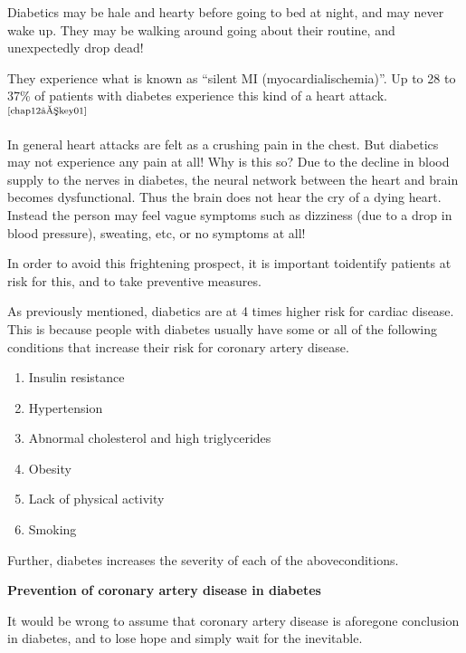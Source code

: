 
Diabetics may be hale and hearty before going to bed at night, and may never wake up. They may be walking around going about their routine, and unexpectedly drop dead!

They experience what is known as “silent MI (myocardial\break ischemia)”. Up to 28 to 37\% of patients with diabetes experience this kind of a heart attack.$^{\text{\cite{chap12–key01}}}$

In general heart attacks are felt as a crushing pain in the chest. But diabetics may not experience any pain at all! Why is this so? Due to the decline in blood supply to the nerves in diabetes, the neural network between the heart and brain becomes dysfunctional. Thus the brain does not hear the cry of a dying heart. Instead the person may feel vague symptoms such as dizziness (due to a drop in blood pressure), sweating, etc, or no symptoms at all!

In order to avoid this frightening prospect, it is important to\break identi\-fy patients at risk for this, and to take preventive measures.


As previously mentioned, diabetics are at 4 times higher risk for cardiac disease. This is because people with diabetes usually have some or all of the following conditions that increase their risk for coronary artery disease.

\vspace{-\topsep}
\begin{enumerate}[•]
\itemsep=0pt
\item Insulin resistance
\item Hypertension
\item Abnormal cholesterol and high triglycerides
\item Obesity
\item Lack of physical activity
\item Smoking
\end{enumerate}
\vspace{-\topsep}

Further, diabetes increases the severity of each of the above\break conditions.

\vskip 6pt
\noindent\textbf{Prevention of coronary artery disease in diabetes}
\vskip 3pt

It would be wrong to assume that coronary artery disease is a\break foregone conclusion in diabetes, and to lose hope and simply wait for the inevitable.

